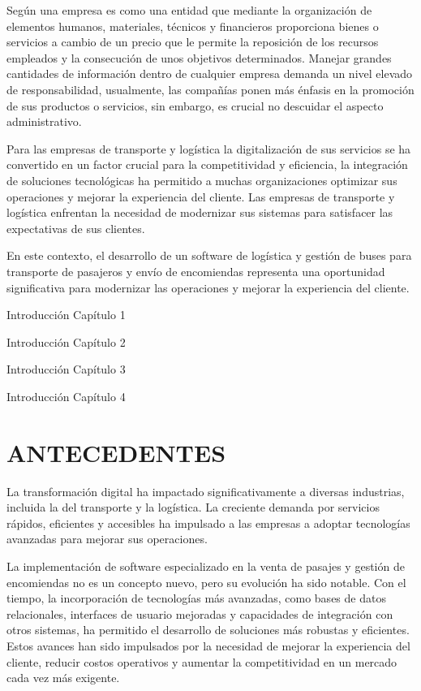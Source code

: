	Según \textcite{casanueva2000practicas} una empresa es como una entidad que mediante la organización de elementos humanos, materiales, técnicos y financieros proporciona bienes o servicios a cambio de un precio que le permite la reposición de los recursos empleados y la consecución de unos objetivos determinados. Manejar grandes cantidades de información dentro de cualquier empresa demanda un nivel elevado de responsabilidad, usualmente, las compañías ponen más énfasis en la promoción de sus productos o servicios, sin embargo, es crucial no descuidar el aspecto administrativo.
	
	Para las empresas de transporte y logística la digitalización de sus servicios se ha convertido en un factor crucial para la competitividad y eficiencia, la integración de soluciones tecnológicas ha permitido a muchas organizaciones optimizar sus operaciones y mejorar la experiencia del cliente. Las empresas de transporte y logística enfrentan la necesidad de modernizar sus sistemas para satisfacer las expectativas de sus clientes. 
	
	En este contexto, el desarrollo de un software de logística y gestión de buses para transporte de pasajeros y envío de encomiendas representa una oportunidad significativa para modernizar las operaciones y mejorar la experiencia del cliente.
	
	Introducción Capítulo 1
	
	Introducción Capítulo 2
	
	Introducción Capítulo 3
	
	Introducción Capítulo 4
	
\section{ANTECEDENTES}

	La transformación digital ha impactado significativamente a diversas industrias, incluida la del transporte y la logística. La creciente demanda por servicios rápidos, eficientes y accesibles ha impulsado a las empresas a adoptar tecnologías avanzadas para mejorar sus operaciones.
	
	La implementación de software especializado en la venta de pasajes y gestión de encomiendas no es un concepto nuevo, pero su evolución ha sido notable. Con el tiempo, la incorporación de tecnologías más avanzadas, como bases de datos relacionales, interfaces de usuario mejoradas y capacidades de integración con otros sistemas, ha permitido el desarrollo de soluciones más robustas y eficientes. Estos avances han sido impulsados por la necesidad de mejorar la experiencia del cliente, reducir costos operativos y aumentar la competitividad en un mercado cada vez más exigente.
		
